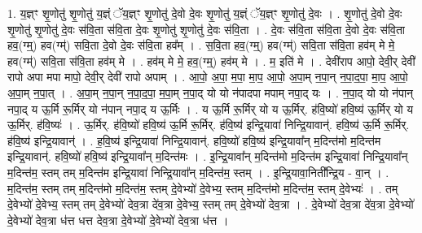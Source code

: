 \documentclass[17pt]{extarticle}
\begin{document}
1. य॒ज्ञ्ꣳ शृ॒णोतु॑ शृ॒णोतु॑ य॒ज्ञ्ं ॅय॒ज्ञ्ꣳ शृ॒णोतु॑ दे॒वो दे॒वः शृ॒णोतु॑ य॒ज्ञ्ं ॅय॒ज्ञ्ꣳ शृ॒णोतु॑ दे॒वः । . शृ॒णोतु॑ दे॒वो दे॒वः शृ॒णोतु॑ शृ॒णोतु॑ दे॒वः स॑वि॒ता स॑वि॒ता दे॒वः शृ॒णोतु॑ शृ॒णोतु॑ दे॒वः स॑वि॒ता । . दे॒वः स॑वि॒ता स॑वि॒ता दे॒वो दे॒वः स॑वि॒ता हव॒(ग्म्॒) हव(ग्म्॑) सवि॒ता दे॒वो दे॒वः स॑वि॒ता हव᳚म् । . स॒वि॒ता हव॒(ग्म्॒) हव(ग्म्॑) सवि॒ता स॑वि॒ता हव॑म् मे मे॒ हव(ग्म्॑) सवि॒ता स॑वि॒ता हव॑म् मे । . हव॑म् मे मे॒ हव॒(ग्म्॒) हव॑म् मे । . म॒ इति॑ मे । . देवी॑राप आपो॒ देवी॒र् देवी॑ रापो अपा मपा मापो॒ देवी॒र् देवी॑ रापो अपाम् । . आ॒पो॒ अ॒पा॒ म॒पा॒ मा॒प॒ आ॒पो॒ अ॒पा॒म् न॒पा॒न् न॒पा॒द॒पा॒ मा॒प॒ आ॒पो॒ अ॒पा॒म् न॒पा॒त् । . अ॒पा॒म् न॒पा॒न् न॒पा॒द॒पा॒ म॒पा॒म् न॒पा॒द् यो यो न॑पादपा मपाम् नपा॒द् यः । . न॒पा॒द् यो यो न॑पान् नपा॒द् य ऊ॒र्मि रू॒र्मिर् यो न॑पान् नपा॒द् य ऊ॒र्मिः । . य ऊ॒र्मि रू॒र्मिर् यो य ऊ॒र्मिर्. ह॑वि॒ष्यो॑ हवि॒ष्य॑ ऊ॒र्मिर् यो य ऊ॒र्मिर्. ह॑वि॒ष्यः॑ । . ऊ॒र्मिर्. ह॑वि॒ष्यो॑ हवि॒ष्य॑ ऊ॒र्मि रू॒र्मिर्. ह॑वि॒ष्य॑ इन्द्रि॒यावा॑ निन्द्रि॒यावान्॑. हवि॒ष्य॑ ऊ॒र्मि रू॒र्मिर्. ह॑वि॒ष्य॑ इन्द्रि॒यावान्॑ । . ह॒वि॒ष्य॑ इन्द्रि॒यावा॑ निन्द्रि॒यावान्॑. हवि॒ष्यो॑ हवि॒ष्य॑ इन्द्रि॒यावा᳚न् म॒दिन्त॑मो म॒दिन्त॑म इन्द्रि॒यावान्॑. हवि॒ष्यो॑ हवि॒ष्य॑ इन्द्रि॒यावा᳚न् म॒दिन्त॑मः । . इ॒न्द्रि॒यावा᳚न् म॒दिन्त॑मो म॒दिन्त॑म इन्द्रि॒यावा॑ निन्द्रि॒यावा᳚न् म॒दिन्त॑म॒ स्तम् तम् म॒दिन्त॑म इन्द्रि॒यावा॑ निन्द्रि॒यावा᳚न् म॒दिन्त॑म॒ स्तम् । . इ॒न्द्रि॒यावा॒निती᳚न्द्रि॒य - वा॒न् । . म॒दिन्त॑म॒ स्तम् तम् म॒दिन्त॑मो म॒दिन्त॑म॒ स्तम् दे॒वेभ्यो॑ दे॒वेभ्य॒ स्तम् म॒दिन्त॑मो म॒दिन्त॑म॒ स्तम् दे॒वेभ्यः॑ । . तम् दे॒वेभ्यो॑ दे॒वेभ्य॒ स्तम् तम् दे॒वेभ्यो॑ देव॒त्रा दे॑व॒त्रा दे॒वेभ्य॒ स्तम् तम् दे॒वेभ्यो॑ देव॒त्रा । . दे॒वेभ्यो॑ देव॒त्रा दे॑व॒त्रा दे॒वेभ्यो॑ दे॒वेभ्यो॑ देव॒त्रा ध॑त्त धत्त देव॒त्रा दे॒वेभ्यो॑ दे॒वेभ्यो॑ देव॒त्रा ध॑त्त । \newline
\end{document}
